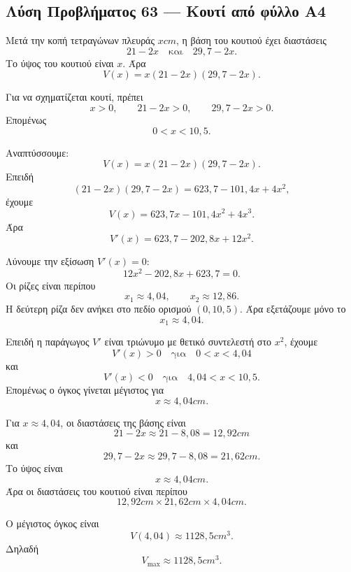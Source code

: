 \subsection*{Λύση Προβλήματος 63 --- Κουτί από φύλλο Α4}

\begin{alist}
  \item Μετά την κοπή τετραγώνων πλευράς \(x\si{cm}\), η βάση του
        κουτιού έχει διαστάσεις
        \[
          21-2x
          \quad\text{και}\quad
          29{,}7-2x.
        \]
        Το ύψος του κουτιού είναι \(x\). Άρα
        \[
          {
          V(x)=x(21-2x)(29{,}7-2x)
          }.
        \]

        Για να σχηματίζεται κουτί, πρέπει
        \[
          x>0,\qquad 21-2x>0,\qquad 29{,}7-2x>0.
        \]
        Επομένως
        \[
          {0<x<10{,}5}.
        \]

  \item Αναπτύσσουμε:
        \[
          V(x)=x(21-2x)(29{,}7-2x).
        \]
        Επειδή
        \[
          (21-2x)(29{,}7-2x)
          =
          623{,}7-101{,}4x+4x^2,
        \]
        έχουμε
        \[
          V(x)=623{,}7x-101{,}4x^2+4x^3.
        \]
        Άρα
        \[
          V'(x)=623{,}7-202{,}8x+12x^2.
        \]

        Λύνουμε την εξίσωση \(V'(x)=0\):
        \[
          12x^2-202{,}8x+623{,}7=0.
        \]
        Οι ρίζες είναι περίπου
        \[
          x_1\approx4{,}04,
          \qquad
          x_2\approx12{,}86.
        \]
        Η δεύτερη ρίζα δεν ανήκει στο πεδίο ορισμού
        \((0,10{,}5)\). Άρα εξετάζουμε μόνο το
        \[
          x_1\approx4{,}04.
        \]

        Επειδή η παράγωγος \(V'\) είναι τριώνυμο με θετικό συντελεστή
        στο \(x^2\), έχουμε
        \[
          V'(x)>0
          \quad\text{για}\quad
          0<x<4{,}04
        \]
        και
        \[
          V'(x)<0
          \quad\text{για}\quad
          4{,}04<x<10{,}5.
        \]
        Επομένως ο όγκος γίνεται μέγιστος για
        \[
          {x\approx4{,}04\si{cm}}.
        \]

  \item Για \(x\approx4{,}04\), οι διαστάσεις της βάσης είναι
        \[
          21-2x\approx21-8{,}08=12{,}92\si{cm}
        \]
        και
        \[
          29{,}7-2x\approx29{,}7-8{,}08=21{,}62\si{cm}.
        \]
        Το ύψος είναι
        \[
          x\approx4{,}04\si{cm}.
        \]
        Άρα οι διαστάσεις του κουτιού είναι περίπου
        \[
          {
          12{,}92\si{cm}\times21{,}62\si{cm}\times4{,}04\si{cm}
          }.
        \]

        Ο μέγιστος όγκος είναι
        \[
          V(4{,}04)\approx1128{,}5\si{cm^3}.
        \]
        Δηλαδή
        \[
          {V_{\max}\approx1128{,}5\si{cm^3}}.
        \]
\end{alist}

